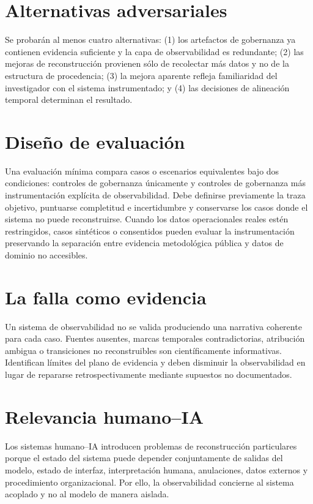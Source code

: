 \documentclass[11pt]{article}
\begin{document}
\section{Alternativas adversariales}
Se probarán al menos cuatro alternativas: (1) los artefactos de gobernanza ya contienen evidencia suficiente y la capa de observabilidad es redundante; (2) las mejoras de reconstrucción provienen sólo de recolectar más datos y no de la estructura de procedencia; (3) la mejora aparente refleja familiaridad del investigador con el sistema instrumentado; y (4) las decisiones de alineación temporal determinan el resultado.

\section{Diseño de evaluación}
Una evaluación mínima compara casos o escenarios equivalentes bajo dos condiciones: controles de gobernanza únicamente y controles de gobernanza más instrumentación explícita de observabilidad. Debe definirse previamente la traza objetivo, puntuarse completitud e incertidumbre y conservarse los casos donde el sistema no puede reconstruirse. Cuando los datos operacionales reales estén restringidos, casos sintéticos o consentidos pueden evaluar la instrumentación preservando la separación entre evidencia metodológica pública y datos de dominio no accesibles.

\section{La falla como evidencia}
Un sistema de observabilidad no se valida produciendo una narrativa coherente para cada caso. Fuentes ausentes, marcas temporales contradictorias, atribución ambigua o transiciones no reconstruibles son científicamente informativas. Identifican límites del plano de evidencia y deben disminuir la observabilidad en lugar de repararse retrospectivamente mediante supuestos no documentados.

\section{Relevancia humano--IA}
Los sistemas humano--IA introducen problemas de reconstrucción particulares porque el estado del sistema puede depender conjuntamente de salidas del modelo, estado de interfaz, interpretación humana, anulaciones, datos externos y procedimiento organizacional. Por ello, la observabilidad concierne al sistema acoplado y no al modelo de manera aislada.
\end{document}
